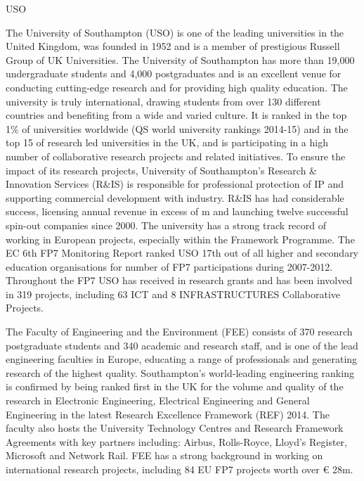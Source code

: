 \begin{sitedescription}{USO}




  The University of Southampton (USO) is one of the leading
  universities in the United Kingdom, was founded in 1952 and is a
  member of prestigious Russell Group of UK Universities. The
  University of Southampton has more than 19,000 undergraduate
  students and 4,000 postgraduates and is an excellent venue for
  conducting cutting-edge research and for providing high quality
  education. The university is truly international, drawing students
  from over 130 different countries and benefiting from a wide and
  varied culture. It is ranked in the top 1\% of universities
  worldwide (QS world university rankings 2014-15) and in the top 15
  of research led universities in the UK, and is participating in a
  high number of collaborative research projects and related
  initiatives. To ensure the impact of its research projects,
  University of Southampton's Research \& Innovation Services (R\&IS)
  is responsible for professional protection of IP and supporting
  commercial development with industry. R\&IS has had considerable
  success, licensing annual revenue in excess of m and
  launching twelve successful spin-out companies since 2000.  The
  university has a strong track record of working in European
  projects, especially within the Framework Programme. The EC 6th FP7
  Monitoring Report ranked USO 17th out of all higher and secondary
  education organisations for number of FP7 participations during
  2007-2012. Throughout the FP7 USO has received  in
  research grants and has been involved in 319 projects, including 63
  ICT and 8 INFRASTRUCTURES Collaborative Projects. 

  The Faculty of Engineering and the Environment (FEE) consists of 370
  research postgraduate students and 340 academic and research
  staff, and is one of the lead engineering faculties in Europe, educating
  a range of professionals and generating research of the highest
  quality. Southampton's world-leading engineering ranking is
  confirmed by being ranked first in the UK for the volume and quality
  of the research in Electronic Engineering, Electrical Engineering
  and General Engineering in the latest Research Excellence Framework
  (REF) 2014. The faculty also hosts the University Technology Centres
  and Research Framework Agreements with key partners including:
  Airbus, Rolls-Royce, Lloyd's Register, Microsoft and Network
  Rail. FEE has a strong background in working on international
  research projects, including 84 EU FP7 projects worth over \euro
  28m.



\end{sitedescription}
